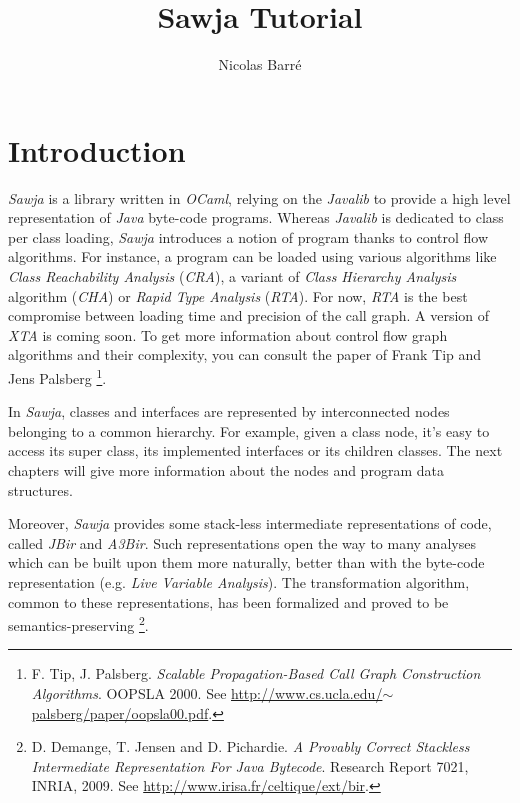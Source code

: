 \documentclass{article}
\title{Sawja Tutorial}
\author{Nicolas Barré}
\begin{document}
\maketitle
\newpage

\tableofcontents
\newpage
\section{Introduction}

\emph{Sawja} is a library written in \emph{OCaml}, relying on the
\emph{Javalib} to provide a high level representation of
\emph{Java} byte-code programs. Whereas \emph{Javalib} is dedicated
to class per class loading, \emph{Sawja} introduces a notion of
program thanks to control flow algorithms. For instance, a program
can be loaded using various algorithms like
\emph{Class Reachability Analysis} (\emph{CRA}), a variant of
\emph{Class Hierarchy Analysis} algorithm (\emph{CHA}) or
\emph{Rapid Type Analysis} (\emph{RTA}). For now, \emph{RTA} is the
best compromise between loading time and precision of the call
graph. A version of \emph{XTA} is coming soon. To get more
information about control flow graph algorithms and their
complexity, you can consult the paper of Frank Tip and Jens
Palsberg%
\footnote{F. Tip, J. Palsberg.
\emph{Scalable Propagation-Based Call Graph Construction Algorithms}.
OOPSLA 2000. See
\href{http://www.cs.ucla.edu/~palsberg/paper/oopsla00.pdf}{http://www.cs.ucla.edu/\ensuremath{\sim}palsberg/paper/oopsla00.pdf}.}.

In \emph{Sawja}, classes and interfaces are represented by
interconnected nodes belonging to a common hierarchy. For example,
given a class node, it's easy to access its super class, its
implemented interfaces or its children classes. The next chapters
will give more information about the nodes and program data
structures.

Moreover, \emph{Sawja} provides some stack-less intermediate
representations of code, called \emph{JBir} and \emph{A3Bir}. Such
representations open the way to many analyses which can be built
upon them more naturally, better than with the byte-code
representation (e.g. \emph{Live Variable Analysis}). The
transformation algorithm, common to these representations, has been
formalized and proved to be semantics-preserving%
\footnote{D. Demange, T. Jensen and D. Pichardie.
\emph{A Provably Correct Stackless Intermediate Representation For Java Bytecode}.
Research Report 7021, INRIA, 2009. See
\href{http://www.irisa.fr/celtique/ext/bir}{http://www.irisa.fr/celtique/ext/bir}.}.
\end{document}
